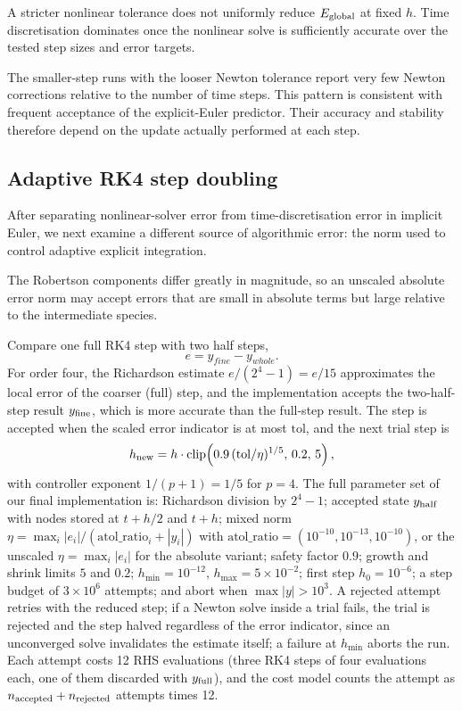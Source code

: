 A stricter nonlinear tolerance does not uniformly reduce $E_{\rm global}$ at fixed $h$. Time discretisation dominates once the nonlinear solve is sufficiently accurate over the tested step sizes and error targets.

The smaller-step runs with the looser Newton tolerance report very few Newton corrections relative to the number of time steps. This pattern is consistent with frequent acceptance of the explicit-Euler predictor. Their accuracy and stability therefore depend on the update actually performed at each step.

\subsection{Adaptive RK4 step doubling}
After separating nonlinear-solver error from time-discretisation error in implicit Euler, we next examine a different source of algorithmic error: the norm used to control adaptive explicit integration.

The Robertson components differ greatly in magnitude, so an unscaled absolute error norm may accept errors that are small in absolute terms but large relative to the intermediate species.

Compare one full RK4 step with two half steps,
\[
e=y_{fine}-y_{whole}.
\]
For order four, the Richardson estimate $e/(2^4-1)=e/15$ approximates the local error of the coarser (full) step, and the implementation accepts the two-half-step result $y_{\rm fine}$, which is more accurate than the full-step result. The step is accepted when the scaled error indicator is at most $\mathrm{tol}$, and the next trial step is
\[
h_{\rm new}=h\cdot\mathrm{clip}\!\left(0.9\,(\mathrm{tol}/\eta)^{1/5},\,0.2,\,5\right),
\]
with controller exponent $1/(p+1)=1/5$ for $p=4$. The full parameter set of our final implementation is: Richardson division by $2^4-1$; accepted state $y_{\rm half}$ with nodes stored at $t+h/2$ and $t+h$; mixed norm
$\eta=\max_i|e_i|/(\mathrm{atol\_ratio}_i+|y_i|)$ with $\mathrm{atol\_ratio}=(10^{-10},10^{-13},10^{-10})$, or the unscaled $\eta=\max_i|e_i|$ for the absolute variant; safety factor $0.9$; growth and shrink limits $5$ and $0.2$; $h_{\min}=10^{-12}$, $h_{\max}=5\times10^{-2}$; first step $h_0=10^{-6}$; a step budget of $3\times10^6$ attempts; and abort when $\max|y|>10^{3}$. A rejected attempt retries with the reduced step; if a Newton solve inside a trial fails, the trial is rejected and the step halved regardless of the error indicator, since an unconverged solve invalidates the estimate itself; a failure at $h_{\min}$ aborts the run. Each attempt costs 12 RHS evaluations (three RK4 steps of four evaluations each, one of them discarded with $y_{\rm full}$), and the cost model counts the attempt as $n_{\rm accepted}+n_{\rm rejected}$ attempts times 12.

